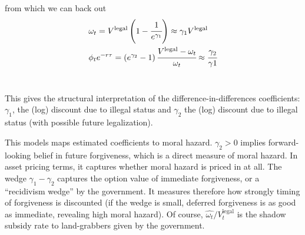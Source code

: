 \documentclass[12pt]{article}
\begin{document}

from which we can back out 
\begin{align*}
 &\omega_t=V^{\text{legal}}\left(1-\cfrac{1}{e^{\gamma_1}}\right)\approx\gamma_1V^{\text{legal}} \\
 &\phi_te^{-r\tau}=\left(e^{\gamma_2}-1\right)\cfrac{V^{\text{legal}}-\omega_t}{\omega_t}\approx\cfrac{\gamma_2}{\gamma1}
\end{align*}
\ 

\quad This gives the structural interpretation of the difference-in-differences coefficients: $\gamma_1$, the (log) discount due to illegal status and $\gamma_2$ the (log) discount due to illegal status (with possible future legalization). 
\ 

\quad This models maps estimated coefficients to moral hazard. $\gamma_2>0$ implies forward-looking belief in future forgiveness, which is a direct measure of moral hazard. In asset pricing terms, it captures whether moral hazard is priced in at all. The wedge $\gamma_1-\gamma_2$ captures the option value of immediate forgiveness, or a ``recidivism wedge'' by the government. It measures therefore how strongly timing of forgiveness is discounted (if the wedge is small, deferred forgiveness is as good as immediate, revealing high moral hazard). Of course, $\widehat{\omega_t}/V_t^{\text{legal}}$ is the shadow subsidy rate to land-grabbers given by the government. 
\ 
\end{document}
